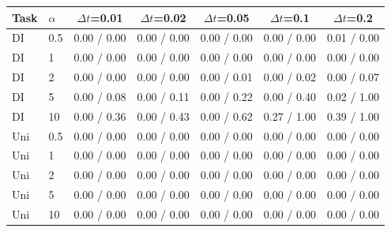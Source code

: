 \begin{tabular}{llccccc}
\hline
Task & $\alpha$ & $\Delta t$=0.01 & $\Delta t$=0.02 & $\Delta t$=0.05 & $\Delta t$=0.1 & $\Delta t$=0.2 \\
\hline
DI & 0.5 & 0.00 / 0.00 & 0.00 / 0.00 & 0.00 / 0.00 & 0.00 / 0.00 & 0.01 / 0.00 \\
DI & 1 & 0.00 / 0.00 & 0.00 / 0.00 & 0.00 / 0.00 & 0.00 / 0.00 & 0.00 / 0.00 \\
DI & 2 & 0.00 / 0.00 & 0.00 / 0.00 & 0.00 / 0.01 & 0.00 / 0.02 & 0.00 / 0.07 \\
DI & 5 & 0.00 / 0.08 & 0.00 / 0.11 & 0.00 / 0.22 & 0.00 / 0.40 & 0.02 / 1.00 \\
DI & 10 & 0.00 / 0.36 & 0.00 / 0.43 & 0.00 / 0.62 & 0.27 / 1.00 & 0.39 / 1.00 \\
\hline
Uni & 0.5 & 0.00 / 0.00 & 0.00 / 0.00 & 0.00 / 0.00 & 0.00 / 0.00 & 0.00 / 0.00 \\
Uni & 1 & 0.00 / 0.00 & 0.00 / 0.00 & 0.00 / 0.00 & 0.00 / 0.00 & 0.00 / 0.00 \\
Uni & 2 & 0.00 / 0.00 & 0.00 / 0.00 & 0.00 / 0.00 & 0.00 / 0.00 & 0.00 / 0.00 \\
Uni & 5 & 0.00 / 0.00 & 0.00 / 0.00 & 0.00 / 0.00 & 0.00 / 0.00 & 0.00 / 0.00 \\
Uni & 10 & 0.00 / 0.00 & 0.00 / 0.00 & 0.00 / 0.00 & 0.00 / 0.00 & 0.00 / 0.00 \\
\hline
\end{tabular}
